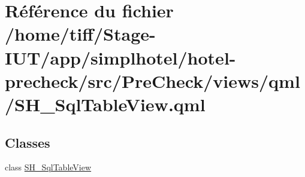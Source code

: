 \hypertarget{SH__SqlTableView_8qml}{\section{Référence du fichier /home/tiff/\-Stage-\/\-I\-U\-T/app/simplhotel/hotel-\/precheck/src/\-Pre\-Check/views/qml/\-S\-H\-\_\-\-Sql\-Table\-View.qml}
\label{SH__SqlTableView_8qml}
}
\subsection*{Classes}
\begin{DoxyCompactItemize}
\item 
class \hyperlink{classSH__SqlTableView}{S\-H\-\_\-\-Sql\-Table\-View}
\end{DoxyCompactItemize}
